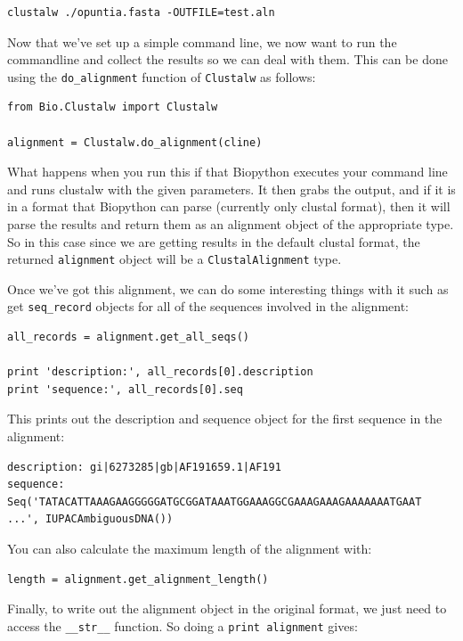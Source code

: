 \documentclass{article}
\begin{document}
\begin{verbatim}
clustalw ./opuntia.fasta -OUTFILE=test.aln
\end{verbatim}

Now that we've set up a simple command line, we now want to run the commandline and collect the results so we can deal with them. This can be done using the \verb|do_alignment| function of \verb|Clustalw| as follows:

\begin{verbatim}
from Bio.Clustalw import Clustalw

alignment = Clustalw.do_alignment(cline)
\end{verbatim}

What happens when you run this if that Biopython executes your command line and runs clustalw with the given parameters. It then grabs the output, and if it is in a format that Biopython can parse (currently only clustal format), then it will parse the results and return them as an alignment object of the appropriate type. So in this case since we are getting results in the default clustal format, the returned \verb|alignment| object will be a \verb|ClustalAlignment| type.


Once we've got this alignment, we can do some interesting things with it such as get \verb|seq_record| objects for all of the sequences involved in the alignment:

\begin{verbatim}
all_records = alignment.get_all_seqs()

print 'description:', all_records[0].description
print 'sequence:', all_records[0].seq
\end{verbatim}

This prints out the description and sequence object for the first sequence in the alignment:

\begin{verbatim}
description: gi|6273285|gb|AF191659.1|AF191
sequence: Seq('TATACATTAAAGAAGGGGGATGCGGATAAATGGAAAGGCGAAAGAAAGAAAAAAATGAAT 
...', IUPACAmbiguousDNA())
\end{verbatim}

You can also calculate the maximum length of the alignment with:

\begin{verbatim}
length = alignment.get_alignment_length()
\end{verbatim}

Finally, to write out the alignment object in the original format, we just need to access the \verb|__str__| function. So doing a \verb|print alignment| gives:
\end{document}
